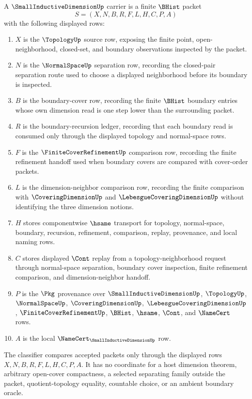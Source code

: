 \begin{definition}
\label{def:small-inductive-dimension-carrier}
A $\SmallInductiveDimensionUp$ carrier is a finite $\BHist$ packet
$$
S=(X,N,B,R,F,L,H,C,P,A)
$$
with the following displayed rows:
\begin{enumerate}
\item $X$ is the $\TopologyUp$ source row, exposing the finite point, open-neighborhood, closed-set, and boundary observations inspected by the packet.
\item $N$ is the $\NormalSpaceUp$ separation row, recording the closed-pair separation route used to choose a displayed neighborhood before its boundary is inspected.
\item $B$ is the boundary-cover row, recording the finite $\BHist$ boundary entries whose own dimension read is one step lower than the surrounding packet.
\item $R$ is the boundary-recursion ledger, recording that each boundary read is consumed only through the displayed topology and normal-space rows.
\item $F$ is the $\FiniteCoverRefinementUp$ comparison row, recording the finite refinement handoff used when boundary covers are compared with cover-order packets.
\item $L$ is the dimension-neighbor comparison row, recording the finite comparison with $\CoveringDimensionUp$ and $\LebesgueCoveringDimensionUp$ without identifying the three dimension notions.
\item $H$ stores componentwise $\hsame$ transport for topology, normal-space, boundary, recursion, refinement, comparison, replay, provenance, and local naming rows.
\item $C$ stores displayed $\Cont$ replay from a topology-neighborhood request through normal-space separation, boundary cover inspection, finite refinement comparison, and dimension-neighbor handoff.
\item $P$ is the $\Pkg$ provenance over $\SmallInductiveDimensionUp$, $\TopologyUp$, $\NormalSpaceUp$, $\CoveringDimensionUp$, $\LebesgueCoveringDimensionUp$, $\FiniteCoverRefinementUp$, $\BHist$, $\hsame$, $\Cont$, and $\NameCert$ rows.
\item $A$ is the local $\NameCert_{\SmallInductiveDimensionUp}$ row.
\end{enumerate}
The classifier compares accepted packets only through the displayed rows $X,N,B,R,F,L,H,C,P,A$. It has no coordinate for a host dimension theorem, arbitrary open-cover compactness, a selected separating family outside the packet, quotient-topology equality, countable choice, or an ambient boundary oracle.
\end{definition}

